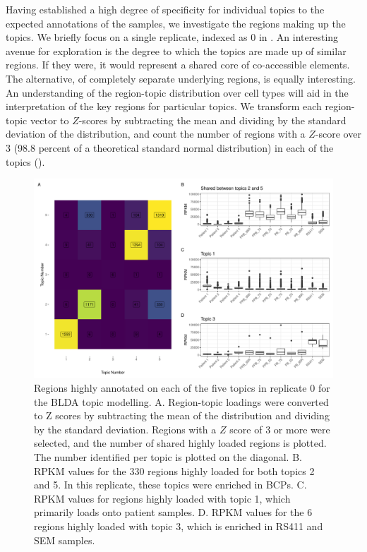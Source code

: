 Having established a high degree of specificity for individual topics to the expected annotations of the samples, we investigate the regions making up the topics. We briefly focus on a single replicate, indexed as 0 in . An interesting avenue for exploration is the degree to which the topics are made up of similar regions. If they were, it would represent a shared core of co-accessible elements. The alternative, of completely separate underlying regions, is equally interesting. An understanding of the region-topic distribution over cell types will aid in the interpretation of the key regions for particular topics. We transform each region-topic vector to $Z$-scores by subtracting the mean and dividing by the standard deviation of the distribution, and count the number of regions with a $Z$-score over 3 (98.8 percent of a theoretical standard normal distribution) in each of the topics (). 

\begin{figure}
    \centering
    \includegraphics[width=\textwidth]{plot/ch5/mll_bigwig_region_sharing_plot_rep0.pdf}
    \caption{Regions highly annotated on each of the five topics in replicate 0 for the BLDA topic modelling. A. Region-topic loadings were converted to Z scores by subtracting the mean of the distribution and dividing by the standard deviation. Regions with a $Z$ score of 3 or more were selected, and the number of shared highly loaded regions is plotted. The number identified per topic is plotted on the diagonal. B. RPKM values for the 330 regions highly loaded for both topics 2 and 5. In this replicate, these topics were enriched in BCPs. C. RPKM values for regions highly loaded with topic 1, which primarily loads onto patient samples. D. RPKM values for the 6 regions highly loaded with topic 3, which is enriched in RS411 and SEM samples.}
    \label{fig:mll_region_sharing}
\end{figure}




